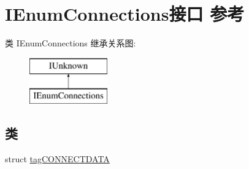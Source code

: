 \hypertarget{interface_i_enum_connections}{}\section{I\+Enum\+Connections接口 参考}
\label{interface_i_enum_connections}
类 I\+Enum\+Connections 继承关系图\+:\begin{figure}[H]
\begin{center}
\leavevmode
\includegraphics[height=2.000000cm]{interface_i_enum_connections}
\end{center}
\end{figure}
\subsection*{类}
\begin{DoxyCompactItemize}
\item 
struct \hyperlink{struct_i_enum_connections_1_1tag_c_o_n_n_e_c_t_d_a_t_a}{tag\+C\+O\+N\+N\+E\+C\+T\+D\+A\+TA}
\end{DoxyCompactItemize}
